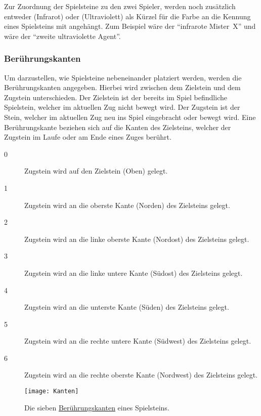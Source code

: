 \documentclass[ngerman, gray]{sdqassignment}
\begin{document}
Zur Zuordnung der Spielsteine zu den zwei Spieler, werden noch zusätzlich entweder  (Infrarot) oder  (Ultraviolett) als Kürzel für die Farbe an die Kennung eines Spielsteins mit angehängt. Zum Beispiel wäre  der \enquote{infrarote Mister~X} und  wäre der \enquote{zweite ultraviolette Agent}.

\subsubsection{Berührungskanten}
\label{kanten}
Um darzustellen, wie Spielsteine nebeneinander platziert werden, werden die Berührungskanten angegeben. Hierbei wird zwischen dem Zielstein und dem Zugstein unterschieden. Der Zielstein ist der bereits im Spiel befindliche Spielstein, welcher im aktuellen Zug nicht bewegt wird. Der Zugstein ist der Stein, welcher im aktuellen Zug neu ins Spiel eingebracht oder bewegt wird. Eine Berührungskante beziehen sich auf die Kanten des Zielsteins, welcher der Zugstein im Laufe oder am Ende eines Zuges berührt.

\begin{description}
    \item[0] Zugstein wird auf den Zielstein (Oben) gelegt.
    \item[1] Zugstein wird an die oberste Kante (Norden) des Zielsteins gelegt.
    \item[2] Zugstein wird an die linke oberste Kante (Nordost) des Zielsteins gelegt.
    \item[3] Zugstein wird an die linke untere Kante (Südost) des Zielsteins gelegt.
    \item[4] Zugstein wird an die unterste Kante (Süden) des Zielsteins gelegt.
    \item[5] Zugstein wird an die rechte untere Kante (Südwest) des Zielsteins gelegt.
    \item[6] Zugstein wird an die rechte oberste Kante (Nordwest) des Zielsteins gelegt.
\end{description}

\begin{figure}[ht]
    \centering
    \texttt{[image: Kanten]}
    \label{fig:kanten}
    \caption{Die sieben \hyperref[kanten]{Berührungskanten} eines Spielsteins.}
\end{figure}
\end{document}

